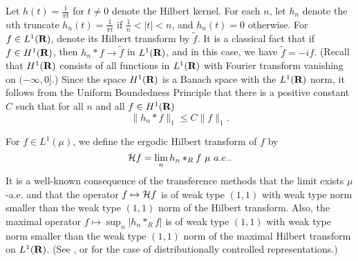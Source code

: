 Let $h(t)=\frac{1}{\pi t}$ for $t\neq 0$ denote the 
Hilbert kernel.  For each $n$,  let $h_n$ denote the $n$th truncate
$h_n(t)=\frac{1}{\pi t}$ if $\frac{1}{n}<|t|<n$, and
$h_n(t)=0$ otherwise.  For $f\in L^1(\R)$,
denote its Hilbert transform by $\widetilde{f}$.
It is a classical fact that if $f\in H^1(\R)$,
then $h_n* f\rightarrow \widetilde{f}$ in $L^1(\R)$,
and in this case, we have $\widetilde{f}=-i f$.
(Recall that $H^1(\R)$ consists of all functions
in $L^1(\R)$ with Fourier transform vanishing on $(-\infty,0]$.)
Since the space $H^1(\R)$ is a Banach space with the
$L^1(\R)$ norm, it follows from the 
Uniform Boundedness Principle that there is 
a positive constant $C$ such that for all
$n$ and all $f\in H^1(\R)$
\begin{equation}
\|h_n*f \|_1\leq C\|f\|_1.
\label{uniform-bdness}
\end{equation}

For $f\in L^1(\mu)$, we define the ergodic Hilbert 
transform of $f$ by
$$\cH f=\lim_n h_n*_R f\ \mu\ a.e..$$
It is a well-known consequence of the
transference methods that the limit exists 
$\mu$-a.e. and that the
operator $f\mapsto {\cal H} f$ is of weak type
$(1,1)$ with weak type norm smaller than the weak
type $(1,1)$ norm of the Hilbert transform.
Also, the maximal operator
$f\mapsto \sup_n\left| h_n*_R f\right|$
is of weak type
$(1,1)$ with weak type norm smaller than the
weak type $(1,1)$ norm of the maximal Hilbert transform
on $L^1(\R)$.  (See \cite{cal,cw1}, or \cite{abg2}
for the case of distributionally controlled representations.)


